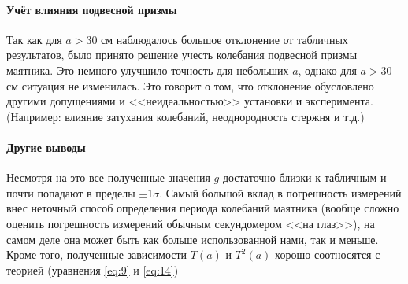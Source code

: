 \documentclass[a4paper,12pt]{article}
\begin{document}
	\paragraph{Учёт влияния подвесной призмы} Так как для $a>30$ см наблюдалось большое отклонение от табличных результатов, было принято решение учесть колебания подвесной призмы маятника. Это немного улучшило точность для небольших $a$, однако для $a>30$ см ситуация не изменилась. Это говорит о том, что отклонение обусловлено другими допущениями и <<неидеальностью>> установки и эксперимента. (Например: влияние затухания колебаний, неоднородность стержня и т.д.)\\
	\vspace{2mm}
	
	\paragraph{Другие выводы}
	\noindent
	Несмотря на это все полученные значения $g$ достаточно близки к табличным и почти попадают в пределы $\pm1\sigma$. Самый большой вклад в погрешность измерений внес неточный способ определения периода колебаний маятника (вообще сложно оценить погрешность измерений обычным секундомером <<на глаз>>), на самом деле она может быть как больше использованной нами, так и меньше. Кроме того, полученные зависимости $T(a)$ и $T^2(a)$ хорошо соотносятся с теорией (уравнения \eqref{eq:9} и \eqref{eq:14})
	
	
\end{document}
